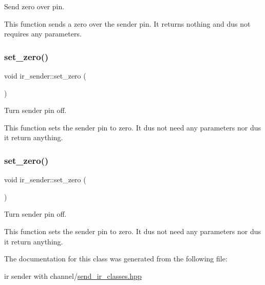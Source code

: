Send zero over pin. 

This function sends a zero over the sender pin. It returns nothing and dus not requires any parameters. \hypertarget{classir__sender_aa38f450682d96d47347dceefb7167976}{}\label{classir__sender_aa38f450682d96d47347dceefb7167976} 
\subsubsection{\texorpdfstring{set\+\_\+zero()}{set\_zero()}\hspace{0.1cm}{\footnotesize\ttfamily [1/2]}}
{\footnotesize\ttfamily void ir\+\_\+sender\+::set\+\_\+zero (\begin{DoxyParamCaption}{ }\end{DoxyParamCaption})\hspace{0.3cm}{\ttfamily [inline]}}



Turn sender pin off. 

This function sets the sender pin to zero. It dus not need any parameters nor dus it return anything. \hypertarget{classir__sender_aa38f450682d96d47347dceefb7167976}{}\label{classir__sender_aa38f450682d96d47347dceefb7167976} 
\subsubsection{\texorpdfstring{set\+\_\+zero()}{set\_zero()}\hspace{0.1cm}{\footnotesize\ttfamily [2/2]}}
{\footnotesize\ttfamily void ir\+\_\+sender\+::set\+\_\+zero (\begin{DoxyParamCaption}{ }\end{DoxyParamCaption})\hspace{0.3cm}{\ttfamily [inline]}}



Turn sender pin off. 

This function sets the sender pin to zero. It dus not need any parameters nor dus it return anything. 

The documentation for this class was generated from the following file\+:\begin{DoxyCompactItemize}
\item 
ir sender with channel/\hyperlink{ir_01sender_01with_01channel_2send__ir__classes_8hpp}{send\+\_\+ir\+\_\+classes.\+hpp}\end{DoxyCompactItemize}
